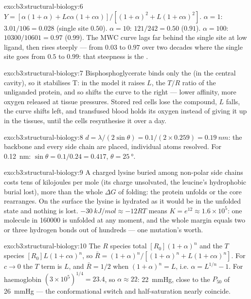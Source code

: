 \begin{solution}{exo:b3:structural-biology:6}
$Y = [\alpha(1+\alpha) + Lc\alpha(1+c\alpha)]/[(1+\alpha)^{2} +
L(1+c\alpha)^{2}]$. $\alpha = 1$: $3.01/106 = 0.028$ (single site
$0.50$). $\alpha = 10$: $121/242 = 0.50$ ($0.91$). $\alpha = 100$:
$\num{10300}/\num{10601} = 0.97$ ($0.99$). The MWC curve lags far
behind the single site at low ligand, then rises steeply --- from $0.03$
to $0.97$ over two decades where the single site goes from $0.5$ to
$0.99$: that steepness is the .
\end{solution}

\begin{solution}{exo:b3:structural-biology:7}
Bisphosphoglycerate binds only the  (in the central cavity), so
it stabilises T: in the model it raises $L$, the $T/R$ ratio of the
unliganded protein, and so shifts the curve to the right --- lower
affinity, more oxygen released at tissue pressures. Stored red cells
lose the compound, $L$ falls, the curve shifts left, and transfused
blood holds its oxygen instead of giving it up in the tissues, until
the cells resynthesise it over a day.
\end{solution}

\begin{solution}{exo:b3:structural-biology:8}
$d = \lambda/(2\sin\theta) = 0.1/(2\times 0.259) = \qty{0.19}{nm}$: the
backbone and every side chain are placed, individual atoms resolved.
For \qty{0.12}{nm}: $\sin\theta = 0.1/0.24 = 0.417$, $\theta =
\qty{25}{\degree}$.
\end{solution}

\begin{solution}{exo:b3:structural-biology:9}
A charged lysine buried among non-polar side chains costs tens of
kilojoules per mole (its charge unsolvated, the leucine's hydrophobic
burial lost), more than the whole $\Delta G$ of folding: the protein
unfolds or the core rearranges. On the surface the lysine is
hydrated as it would be in the unfolded state and nothing is lost.
$\qty{-30}{kJ/mol} \approx -12RT$ means $K = e^{12} \approx 1.6\times
10^{5}$: one molecule in \num{160000} is unfolded at any moment, and
the whole margin equals two or three hydrogen bonds out of hundreds
--- one mutation's worth.
\end{solution}

\begin{solution}{exo:b3:structural-biology:10}
The $R$ species total $[R_{0}](1+\alpha)^{n}$ and the $T$ species
$[R_{0}]L(1+c\alpha)^{n}$, so $\bar R = (1+\alpha)^{n}/[(1+\alpha)^{n}
+ L(1+c\alpha)^{n}]$. For $c \to 0$ the $T$ term is $L$, and $\bar R =
1/2$ when $(1+\alpha)^{n} = L$, i.e. $\alpha = L^{1/n} - 1$. For
haemoglobin $(3\times 10^{5})^{1/4} = 23.4$, so $\alpha \approx 22$:
\qty{22}{mmHg}, close to the $P_{50}$ of \qty{26}{mmHg} --- the
conformational switch and half-saturation nearly coincide.
\end{solution}

